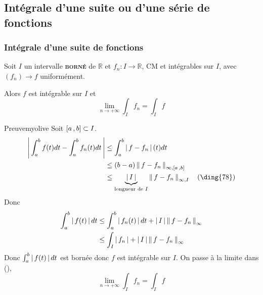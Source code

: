 \subsection{Intégrale d’une suite ou d’une série de fonctions}

    \subsubsection{Intégrale d’une suite de fonctions}

    \begin{prop}{}{}
        Soit $I$ un intervalle \textcolor{myolive}{\textbf{\textsc{borné}}} de $\mathbb{R}$ et $f_n : I \to \mathbb{R}$, CM et intégrables sur $I$, avec $(f_n) \to f$ uniformément.

        Alors $f$ est intégrable sur $I$ et 
        \[ \lim_{n \to +\infty} \int_I  f_n = \int_I f \]   
    \end{prop}

    \begin{demo}{Preuve}{myolive}
        Soit $\left[ a \, , b \right] \subset I$. 
        \begin{align*}
            \abs{\int_{a}^{b} f(t)dt - \int_{a}^{b} f_n(t)dt} 
            &\leq \int_{a}^{b} \abs{f-f_n}(t)dt \\
            &\leq (b-a) \nnorm{\infty, \intervalleFF{a}{b}}{f-f_n} \\
            &\leq \underbrace{\abs{I}}_{\text{longueur de } I} \nnorm{\infty, I}{f-f_n} \quad (\text{\ding{78}})
        \end{align*}
        Donc 
        \begin{align*}
            \int_{a}^{b} \left\lvert \,f(t) \, \right\rvert dt 
            &\leq \int_{a}^{b} \left\lvert \,f_n(t) \, \right\rvert dt + \left\lvert \,I \, \right\rvert \left\lVert\,f - f_n\,\right\rVert_{\infty} \\
            &\leq \int_I \left\lvert \,f_n \, \right\rvert + \left\lvert \,I \, \right\rvert \left\lVert\,f - f_n\,\right\rVert_{\infty}
        \end{align*}
        Donc $\int_{a}^{b} \left\lvert \,f(t) \, \right\rvert dt$ est bornée donc $f$ est intégrable sur $I$. On passe à la limite dans (),
        \[ \lim_{n \to + \infty} \int_I f_n = \int_I f \]
    \end{demo}

